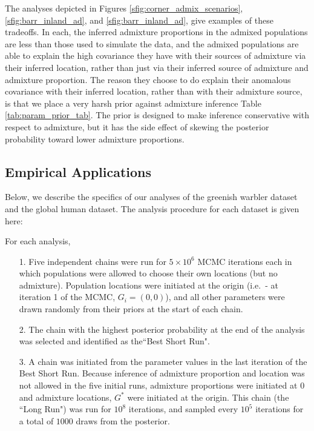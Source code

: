 \documentclass[12pt]{article}
\newcommand{\admixsource}[1]{{$G^{*}$}}
\begin{document}
The analyses depicted in Figures \ref{sfig:corner_admix_scenarios}, 
\ref{sfig:barr_inland_ad}, and
\ref{sfig:barr_inland_ad}, 
give examples of these tradeoffs.
In each, the inferred admixture proportions in the admixed populations are less than those used to simulate the data,
and the admixed populations are able to explain the high covariance they have with their sources of admixture via their inferred location,
rather than just via their inferred source of admixture and admixture proportion.  
The reason they choose to do explain their anomalous covariance with their inferred location,
rather than with their admixture source,
is that we place a very harsh prior against admixture inference Table \ref{tab:param_prior_tab}.
The prior is designed to make inference conservative with respect to admixture,
but it has the side effect of skewing the posterior probability toward lower admixture proportions.


\subsection*{Empirical Applications}
Below, we describe the specifics of our analyses of the greenish warbler dataset and the global human dataset.  The analysis procedure for each dataset is given here:

For each analysis,
\begin{itemize}
\item[1.] Five independent chains were run for $5\times 10^6$ MCMC iterations each in which populations were allowed to choose their own locations (but no admixture).  Population locations were initiated at the origin (i.e.\ - at iteration 1 of the MCMC, $G_i = (0,0)$), and all other parameters were drawn randomly from their priors at the start of each chain.  
%
\item[2.]The chain with the highest posterior probability at the end of the analysis was selected and identified as the``Best Short Run".
%
\item[3.] A chain was initiated from the parameter values in the last iteration of the Best Short Run.  Because inference of admixture proportion and location was not allowed in the five initial runs, admixture proportions were initiated at 0 and admixture locations, \admixsource{G} were initiated at the origin.  This  chain (the ``Long Run") was run for $10^8$ iterations, and sampled every $10^5$ iterations for a total of $1000$ draws from the posterior.
\end{itemize}
\end{document}
